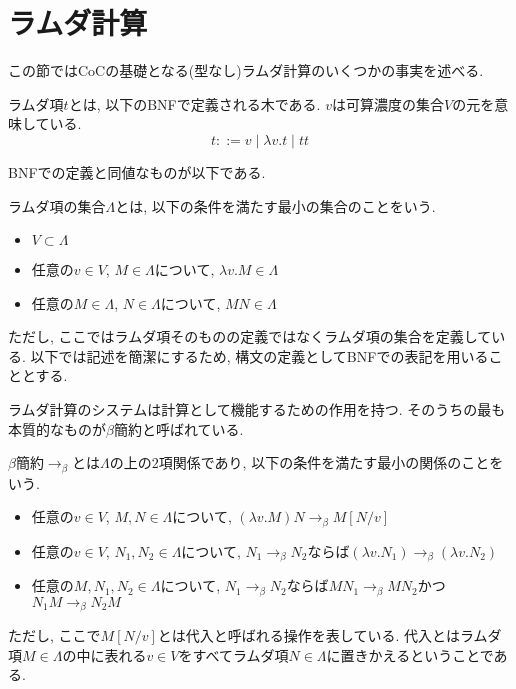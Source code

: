 \documentclass[12pt, titlepage]{ltjsarticle}
\begin{document}

\section{ラムダ計算}\label{lambda}
この節ではCoCの基礎となる(型なし)ラムダ計算のいくつかの事実を述べる.

\begin{defn}
 ラムダ項$t$とは, 以下のBNFで定義される木である. $v$は可算濃度の集合$V$の元を意味している.
 \[
 t ::= v \mid \lambda v. t \mid t t
 \]
\end{defn}

BNFでの定義と同値なものが以下である.

\begin{defn}
 ラムダ項の集合$\Lambda$とは, 以下の条件を満たす最小の集合のことをいう.
 \begin{itemize}
  \item $V \subset \Lambda$
  \item 任意の$v \in V$, $M \in \Lambda$について, $\lambda v. M \in \Lambda$
  \item 任意の$M \in \Lambda$, $N \in \Lambda$について, $M N \in \Lambda$
 \end{itemize}
\end{defn}

ただし, ここではラムダ項そのものの定義ではなくラムダ項の集合を定義している. 以下では記述を簡潔にするため, 構文の定義としてBNFでの表記を用いることとする.

ラムダ計算のシステムは計算として機能するための作用を持つ. そのうちの最も本質的なものが$\beta$簡約と呼ばれている.

\begin{defn}
 $\beta$簡約$\rightarrow_{\beta}$とは$\Lambda$の上の$2$項関係であり, 以下の条件を満たす最小の関係のことをいう.
 \begin{itemize}
  \item 任意の$v \in V$, $M, N \in \Lambda$について, $(\lambda v. M) N \rightarrow_\beta M[N/v]$
  \item 任意の$v \in V$, $N_1, N_2 \in \Lambda$について, $N_1 \rightarrow_\beta N_2$ならば$(\lambda v. N_1) \rightarrow_\beta (\lambda v. N_2)$
  \item 任意の$M, N_1, N_2 \in \Lambda$について, $N_1 \rightarrow_\beta N_2$ならば$M N_1 \rightarrow_\beta M N_2$かつ$N_1 M \rightarrow_\beta N_2 M$
 \end{itemize}
 ただし, ここで$M[N/v]$とは代入と呼ばれる操作を表している. 代入とはラムダ項$M \in \Lambda$の中に表れる$v \in V$をすべてラムダ項$N \in \Lambda$に置きかえるということである.
\end{defn}
\end{document}
